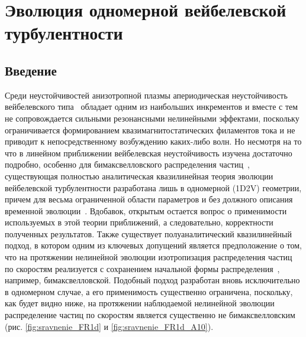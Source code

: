 \chapter{Эволюция одномерной вейбелевской турбулентности}\label{ch:ch1}

\section{Введение}\label{sec:ch1/sec1}

Среди неустойчивостей анизотропной плазмы апериодическая неустойчивость вейбелевского типа~\cite{Weibel1959,Zhou2022,Fried1959,Kalman1968,Morse1971,Kocharovsky2016,Lazar2006,Stockem2009,SchaeferRolffs2006} обладает одним из наибольших инкрементов и вместе с тем не сопровождается сильными резонансными нелинейными эффектами, поскольку ограничивается формированием квазимагнитостатических филаментов тока и не приводит к непосредственному возбуждению каких-либо волн. 
Но несмотря на то что в линейном приближении вейбелевская неустойчивость изучена достаточно подробно, особенно для бимаксвелловского распределения частиц~\cite{Weibel1959,Fried1959,Vagin2014}, существующая полностью аналитическая квазилинейная теория эволюции вейбелевской турбулентности разработана лишь в одномерной (1D2V) геометрии, причем для весьма ограниченной области параметров и без должного описания временной эволюции~\cite{Pokhotelov2011,GaleevSagdeev1969}. 
Вдобавок, открытым остается вопрос о применимости используемых в этой теории приближений, а следовательно, корректности полученных результатов.  
Также существует полуаналитический квазилинейный подход, в котором одним из ключевых допущений является предположение о том, что на протяжении нелинейной эволюции изотропизация распределения частиц по скоростям реализуется с сохранением начальной формы распределения~\cite{Seough2015b,Ruyer2015,StockemNovo2015}, например, бимаксвелловской.
Подобный подход разработан вновь исключительно в одномерном случае, а его применимость существенно ограничена, поскольку, как будет видно ниже, на протяжении наблюдаемой нелинейной эволюции распределение частиц по скоростям является существенно не бимаксвелловским (рис. \ref{fig:sravnenie_FR1d} и \ref{fig:sravnenie_FR1d_A10}).

